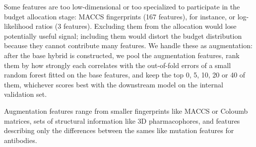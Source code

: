 
Some features are too low-dimensional or too specialized to participate in the budget allocation stage: MACCS fingerprints (167 features), for instance, or log-likelihood ratios (3 features). Excluding them from the allocation would lose potentially useful signal; including them would distort the budget distribution because they cannot contribute many features. We handle these as augmentation: after the base hybrid is constructed, we pool the augmentation features, rank them by how strongly each correlates with the out-of-fold errors of a small random forest fitted on the base features, and keep the top 0, 5, 10, 20 or 40 of them, whichever scores best with the downstream model on the internal validation set.

Augmentation features range from smaller fingerprints like MACCS or Coloumb matrices, sets of structural information like 3D pharmacophores, and features describing only the differences between the sames like mutation features for antibodies.


